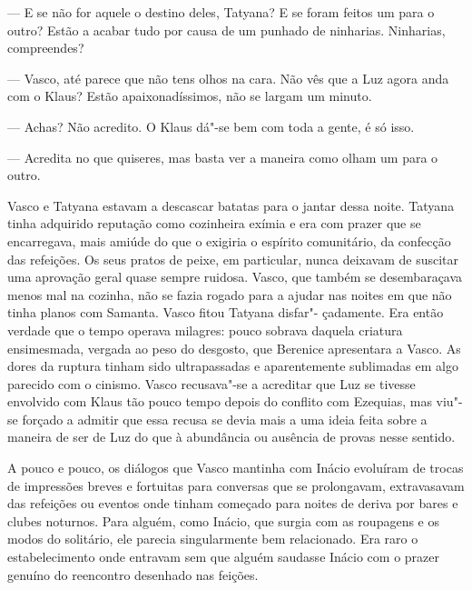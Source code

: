 --- E se não for aquele o destino deles, Tatyana? E se foram feitos um
  para o outro? Estão a acabar tudo por causa de um punhado de
  ninharias. Ninharias, compreendes?

--- Vasco, até parece que não tens olhos na cara. Não vês que a Luz agora
  anda com o Klaus? Estão apaixonadíssimos, não se largam um minuto.

--- Achas? Não acredito. O Klaus dá"-se bem com toda a gente, é só isso.

--- Acredita no que quiseres, mas basta ver a maneira como olham um para o
  outro.


Vasco e Tatyana estavam a descascar batatas para o jantar dessa noite.
Tatyana tinha adquirido reputação como cozinheira exímia e era com
prazer que se encarregava, mais amiúde do que o exigiria o espírito
comunitário, da confecção das refeições. Os seus pratos de peixe, em
particular, nunca deixavam de suscitar uma aprovação geral quase sempre
ruidosa. Vasco, que também se desembaraçava menos mal na cozinha, não
se fazia rogado para a ajudar nas noites em que não tinha planos com
Samanta. Vasco fitou Tatyana disfar"- çadamente. Era então verdade que o
tempo operava milagres: pouco sobrava daquela criatura ensimesmada,
vergada ao peso do desgosto, que Berenice apresentara a Vasco. As dores
da ruptura tinham sido ultrapassadas e aparentemente sublimadas em
algo parecido com o cinismo. Vasco recusava"-se a acreditar que Luz se
tivesse envolvido com Klaus tão pouco tempo depois do conflito com
Ezequias, mas viu"-se forçado a admitir que essa recusa se devia mais a
uma ideia feita sobre a maneira de ser de Luz do que à abundância ou
ausência de provas nesse sentido.

A pouco e pouco, os diálogos que Vasco mantinha com Inácio evoluíram de
trocas de impressões breves e fortuitas para conversas que se
prolongavam, extravasavam das refeições ou eventos onde tinham começado
para noites de deriva por bares e clubes noturnos. Para alguém, como
Inácio, que surgia com as roupagens e os modos do solitário, ele parecia
singularmente bem relacionado. Era raro o estabelecimento onde entravam
sem que alguém saudasse Inácio com o prazer genuíno do reencontro
desenhado nas feições.

